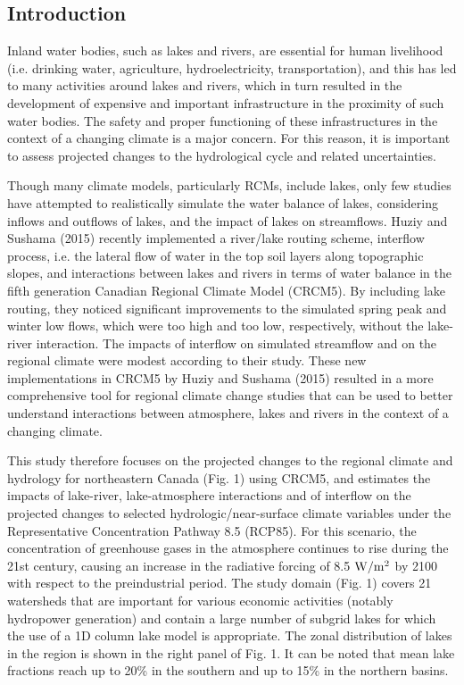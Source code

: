 \documentclass[a0,landscape]{a0poster}
\begin{document}
\begin{multicols}{3}

\color{SaddleBrown} %

\section*{Introduction}
Inland water bodies, such as lakes and rivers, are essential for human
livelihood (i.e. drinking water, agriculture, hydroelectricity, transportation),
and this has led to many activities around lakes and rivers, which in turn
resulted in the development of expensive and important infrastructure in the
proximity of such water bodies. The safety and proper functioning of these
infrastructures in the context of a changing climate is a major concern. For
this reason, it is important to assess projected changes to the hydrological
cycle and related uncertainties.

Though many climate models, particularly RCMs, include lakes, only few studies
have attempted to realistically simulate the water balance of lakes, considering
inflows and outflows of lakes, and the impact of lakes on streamflows. Huziy and
Sushama (2015) recently implemented a river/lake routing scheme, interflow
process, i.e. the lateral flow of water in the top soil layers along topographic
slopes, and interactions between lakes and rivers in terms of water balance in
the fifth generation Canadian Regional Climate Model (CRCM5). By including lake
routing, they noticed significant improvements to the simulated spring peak and
winter low flows, which were too high and too low, respectively, without the
lake-river interaction. The impacts of interflow on simulated streamflow and on
the regional climate were modest according to their study. These new
implementations in CRCM5 by Huziy and Sushama (2015) resulted in a more
comprehensive tool for regional climate change studies that can be used to
better understand interactions between atmosphere, lakes and rivers in the
context of a changing climate.

This study therefore focuses on the projected changes to the regional climate
and hydrology for northeastern Canada (Fig. 1) using CRCM5, and estimates the
impacts of lake-river, lake-atmosphere interactions and of interflow on the
projected changes to selected hydrologic/near-surface climate variables under
the Representative Concentration Pathway 8.5 (RCP85). For this scenario, the
concentration of greenhouse gases in the atmosphere continues to rise during the
21st century, causing an increase in the radiative forcing of 8.5 ${\rm W/m^2}$ by 2100
with respect to the preindustrial period. The study domain (Fig. 1) covers 21
watersheds that are important for various economic activities (notably
hydropower generation) and contain a large number of subgrid lakes for which the
use of a 1D column lake model is appropriate. The zonal distribution of lakes in
the region is shown in the right panel of Fig. 1. It can be noted that mean lake
fractions reach up to 20\% in the southern and up to 15\% in the northern
basins.


\end{multicols}
\end{document}
